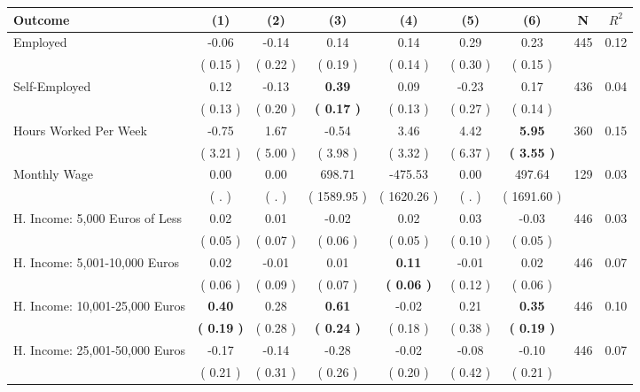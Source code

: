 \begin{tabular}{lcccccccc}
\toprule
 \textbf{Outcome} & \textbf{(1)} & \textbf{(2)} & \textbf{(3)} & \textbf{(4)} & \textbf{(5)} & \textbf{(6)} & \textbf{N} & \textbf{$ R^2$} \\
\midrule
Employed &     -0.06 &     -0.14 &      0.14 &      0.14 &      0.29 &      0.23 & 445 &       0.12 \\ 
 & (     0.15 ) & (     0.22 ) & (     0.19 ) & (     0.14 ) & (     0.30 ) & (     0.15 ) & \\
Self-Employed &      0.12 &     -0.13 & \textbf{     0.39} &      0.09 &     -0.23 &      0.17 & 436 &       0.04 \\ 
 & (     0.13 ) & (     0.20 ) & \textbf{(     0.17 )} & (     0.13 ) & (     0.27 ) & (     0.14 ) & \\
Hours Worked Per Week &     -0.75 &      1.67 &     -0.54 &      3.46 &      4.42 & \textbf{     5.95} & 360 &       0.15 \\ 
 & (     3.21 ) & (     5.00 ) & (     3.98 ) & (     3.32 ) & (     6.37 ) & \textbf{(     3.55 )} & \\
Monthly Wage &      0.00 &      0.00 &    698.71 &   -475.53 &      0.00 &    497.64 & 129 &       0.03 \\ 
 & (        . ) & (        . ) & (  1589.95 ) & (  1620.26 ) & (        . ) & (  1691.60 ) & \\
H. Income: 5,000 Euros of Less &      0.02 &      0.01 &     -0.02 &      0.02 &      0.03 &     -0.03 & 446 &       0.03 \\ 
 & (     0.05 ) & (     0.07 ) & (     0.06 ) & (     0.05 ) & (     0.10 ) & (     0.05 ) & \\
H. Income: 5,001-10,000 Euros &      0.02 &     -0.01 &      0.01 & \textbf{     0.11} &     -0.01 &      0.02 & 446 &       0.07 \\ 
 & (     0.06 ) & (     0.09 ) & (     0.07 ) & \textbf{(     0.06 )} & (     0.12 ) & (     0.06 ) & \\
H. Income: 10,001-25,000 Euros & \textbf{     0.40} &      0.28 & \textbf{     0.61} &     -0.02 &      0.21 & \textbf{     0.35} & 446 &       0.10 \\ 
 & \textbf{(     0.19 )} & (     0.28 ) & \textbf{(     0.24 )} & (     0.18 ) & (     0.38 ) & \textbf{(     0.19 )} & \\
H. Income: 25,001-50,000 Euros &     -0.17 &     -0.14 &     -0.28 &     -0.02 &     -0.08 &     -0.10 & 446 &       0.07 \\ 
 & (     0.21 ) & (     0.31 ) & (     0.26 ) & (     0.20 ) & (     0.42 ) & (     0.21 ) & \\

\end{tabular}
